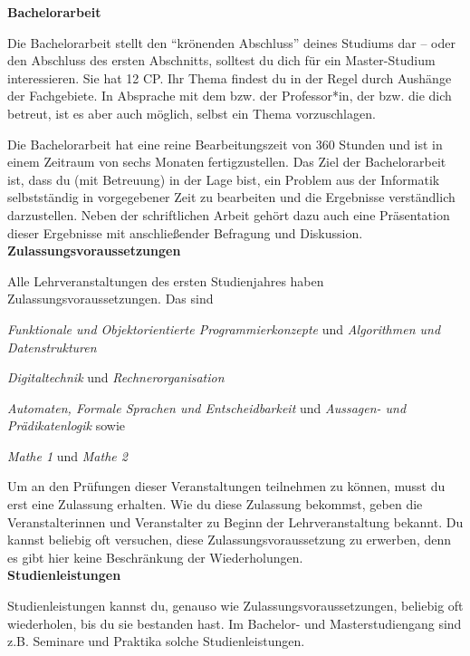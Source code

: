 {    \noindent\textbf{Bachelorarbeit}

    Die Bachelorarbeit stellt den "`krönenden Abschluss"' deines Studiums dar – oder den Abschluss des ersten Abschnitts, solltest du dich für ein Master-Studium interessieren. Sie hat 12 CP. Ihr Thema findest du in der Regel durch Aushänge der Fachgebiete. In Absprache mit dem bzw. der Professor*in, der bzw. die dich betreut, ist es aber auch möglich, selbst ein Thema vorzuschlagen.

    Die Bachelorarbeit hat eine reine Bearbeitungszeit von 360 Stunden und ist in einem Zeitraum von sechs Monaten fertigzustellen. Das Ziel der Bachelorarbeit ist, dass du (mit Betreuung) in der Lage bist, ein Problem aus der Informatik selbstständig in vorgegebener Zeit zu bearbeiten und die Ergebnisse verständlich darzustellen. Neben der schriftlichen Arbeit gehört dazu auch eine Präsentation dieser Ergebnisse mit anschließender Befragung und Diskussion.\\

    \noindent\textbf{Zulassungsvoraussetzungen}

    Alle Lehrveranstaltungen des ersten Studienjahres haben Zulassungsvoraussetzungen. Das sind \begin{compactitem} \item \textit{Funktionale und Objektorientierte Programmierkonzepte} und \textit{Algorithmen und Datenstrukturen} \item \textit{Digitaltechnik} und \textit{Rechnerorganisation} \item \textit{Automaten, Formale Sprachen und Entscheidbarkeit} und \textit{Aussagen- und Prädikatenlogik} sowie \item \textit{Mathe 1} und \textit{Mathe 2}\end{compactitem}
    Um an den Prüfungen dieser Veranstaltungen teilnehmen zu können, musst du erst eine Zulassung erhalten. Wie du diese Zulassung bekommst, geben die Veranstalterinnen und Veranstalter zu Beginn der Lehrveranstaltung bekannt. Du kannst beliebig oft versuchen, diese Zulassungsvoraussetzung zu erwerben, denn es gibt hier keine Beschränkung der Wiederholungen.\\

    \noindent\textbf{Studienleistungen}

    Studienleistungen kannst du, genauso wie Zulassungsvoraussetzungen, beliebig oft wiederholen, bis du sie bestanden hast. Im Bachelor- und Masterstudiengang sind z.B. Seminare und Praktika solche Studienleistungen.\\

}
